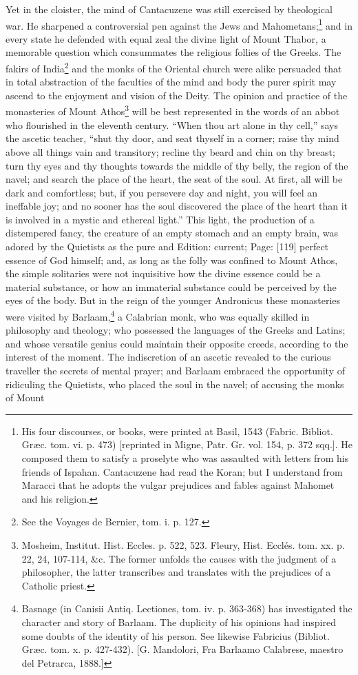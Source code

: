 Yet in the cloister, the mind of Cantacuzene was still exercised by theological war. He sharpened a controversial pen against the Jews and Mahometans;\footnote{His four discourses, or books, were printed at Basil, 1543 (Fabric. Bibliot. Græc. tom. vi. p. 473) [reprinted in Migne, Patr. Gr. vol. 154, p. 372 sqq.]. He composed them to satisfy a proselyte who was assaulted with letters from his friends of Ispahan. Cantacuzene had read the Koran; but I understand from Maracci that he adopts the vulgar prejudices and fables against Mahomet and his religion.} and in every state he defended with equal zeal the divine light of Mount Thabor, a memorable question which consummates the religious follies of the Greeks. The fakirs of India\footnote{See the Voyages de Bernier, tom. i. p. 127.} and the monks of the Oriental church were alike persuaded that in total abstraction of the faculties of the mind and body the purer spirit may ascend to the enjoyment and vision of the Deity. The opinion and practice of the monasteries of Mount Athos\footnote{Mosheim, Institut. Hist. Eccles. p. 522, 523. Fleury, Hist. Ecclés. tom. xx. p. 22, 24, 107-114, \&c. The former unfolds the causes with the judgment of a philosopher, the latter transcribes and translates with the prejudices of a Catholic priest.} will be best represented in the words of an abbot who flourished in the eleventh century. \texthebrew{“}When thou art alone in thy cell,\texthebrew{}” says the ascetic teacher, \texthebrew{“}shut thy door, and seat thyself in a corner; raise thy mind above all things vain and transitory; recline thy beard and chin on thy breast; turn thy eyes and thy thoughts towards the middle of thy belly, the region of the navel; and search the place of the heart, the seat of the soul. At first, all will be dark and comfortless; but, if you persevere day and night, you will feel an ineffable joy; and no sooner has the soul discovered the place of the heart than it is involved in a mystic and ethereal light.\texthebrew{}” This light, the production of a distempered fancy, the creature of an empty stomach and an empty brain, was adored by the Quietists as the pure and Edition: current; Page: [119] perfect essence of God himself; and, as long as the folly was confined to Mount Athos, the simple solitaries were not inquisitive how the divine essence could be a material substance, or how an immaterial substance could be perceived by the eyes of the body. But in the reign of the younger Andronicus these monasteries were visited by Barlaam,\footnote{Basnage (in Canisii Antiq. Lectiones, tom. iv. p. 363-368) has investigated the character and story of Barlaam. The duplicity of his opinions had inspired some doubts of the identity of his person. See likewise Fabricius (Bibliot. Græc. tom. x. p. 427-432). [G. Mandolori, Fra Barlaamo Calabrese, maestro del Petrarca, 1888.]} a Calabrian monk, who was equally skilled in philosophy and theology; who possessed the languages of the Greeks and Latins; and whose versatile genius could maintain their opposite creeds, according to the interest of the moment. The indiscretion of an ascetic revealed to the curious traveller the secrets of mental prayer; and Barlaam embraced the opportunity of ridiculing the Quietists, who placed the soul in the navel; of accusing the monks of Mount 